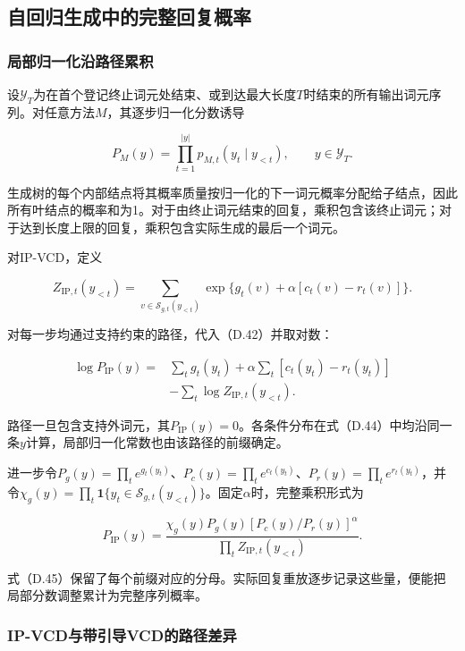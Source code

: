 \subsection{自回归生成中的完整回复概率}\label{ux81eaux56deux5f52ux751fux6210ux4e2dux7684ux5b8cux6574ux56deux590dux6982ux7387}

\subsubsection{局部归一化沿路径累积}\label{ux5c40ux90e8ux5f52ux4e00ux5316ux6cbfux8defux5f84ux7d2fux79ef}

设\(\mathcal Y_T\)为在首个登记终止词元处结束、或到达最大长度\(T\)时结束的所有输出词元序列。对任意方法\(M\)，其逐步归一化分数诱导

\[
P_M(y)=\prod_{t=1}^{|y|}p_{M,t}(y_t\mid y_{<t}),\qquad y\in\mathcal Y_T.
\tag{D.42}
\]

生成树的每个内部结点将其概率质量按归一化的下一词元概率分配给子结点，因此所有叶结点的概率和为1。对于由终止词元结束的回复，乘积包含该终止词元；对于达到长度上限的回复，乘积包含实际生成的最后一个词元。

对IP-VCD，定义

\[
Z_{\mathrm{IP},t}(y_{<t})
=\sum_{v\in\mathcal S_{g,t}(y_{<t})}
\exp\{g_t(v)+\alpha[c_t(v)-r_t(v)]\}.
\tag{D.43}
\]

对每一步均通过支持约束的路径，代入（D.42）并取对数：

\[
\begin{aligned}
\log P_{\mathrm{IP}}(y)
={}&\sum_t g_t(y_t)
+\alpha\sum_t[c_t(y_t)-r_t(y_t)]\\
&-\sum_t\log Z_{\mathrm{IP},t}(y_{<t}).
\end{aligned}
\tag{D.44}
\]

路径一旦包含支持外词元，其\(P_{\mathrm{IP}}(y)=0\)。各条件分布在式（D.44）中均沿同一条\(y\)计算，局部归一化常数也由该路径的前缀确定。

进一步令\(P_g(y)=\prod_t e^{g_t(y_t)}\)、\(P_c(y)=\prod_t e^{c_t(y_t)}\)、\(P_r(y)=\prod_t e^{r_t(y_t)}\)，并令\(\chi_g(y)=\prod_t\mathbf1\{y_t\in\mathcal S_{g,t}(y_{<t})\}\)。固定\(\alpha\)时，完整乘积形式为

\[
P_{\mathrm{IP}}(y)
=\frac{\chi_g(y)P_g(y)[P_c(y)/P_r(y)]^\alpha}
{\prod_t Z_{\mathrm{IP},t}(y_{<t})}.
\tag{D.45}
\]

式（D.45）保留了每个前缀对应的分母。实际回复重放逐步记录这些量，便能把局部分数调整累计为完整序列概率。

\subsubsection{IP-VCD与带引导VCD的路径差异}\label{ip-vcdux4e0eux5e26ux5f15ux5bfcvcdux7684ux8defux5f84ux5deeux5f02}


